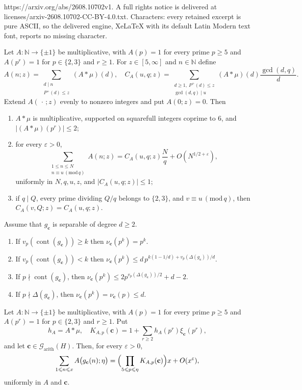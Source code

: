 \documentclass[10pt,a4paper]{amsart}
\DeclareMathOperator{\cont}{cont}
\newcommand{\NN}{\mathbb{N}}
\newcommand{\cc}{\mathbf{c}}
\renewcommand{\ge}{\geqslant}
\renewcommand{\le}{\leqslant}
\renewcommand{\pmod}[1]{\,(\mathrm{mod}\,#1)}
\begin{document}
https://arxiv.org/abs/2608.10702v1. A full rights notice is delivered at licenses/arxiv-2608.10702-CC-BY-4.0.txt. Characters: every retained excerpt is pure ASCII, so the delivered engine, XeLaTeX with its default Latin Modern text font, reports no missing character.
\begin{lemma}\label{lem:squarefull-kernel}
Let $A:\NN\to\{\pm1\}$ be multiplicative, with $A(p)=1$ for every prime $p\ge5$ and $A(p^r)=1$ for $p\in\{2,3\}$ and $r\ge1$.
For $z\in[5,\infty]$ and $n\in\NN$ define
\[
A(n;z)=\sum_{\substack{d\mid n\\P^+(d)\le z}}(A*\mu)(d),\quad
C_A(u,q;z)=\sum_{\substack{d\ge1,\ P^+(d)\le z\\\gcd(d,q)\mid u}}
(A*\mu)(d)\frac{\gcd(d,q)}d.
\]
Extend $A(\,\cdot\,;z)$ evenly to nonzero integers and put $A(0;z)=0$.
Then
\begin{enumerate}
\item $A*\mu$ is multiplicative, supported on squarefull integers coprime to $6$, and $|(A*\mu)(p^r)|\le2$;
\item for every $\varepsilon>0$,
\[
\sum_{\substack{1\le n\le N\\n\equiv u\pmod q}}A(n;z)
=C_A(u,q;z)\frac Nq+O(N^{1/2+\varepsilon}),
\]
uniformly in $N,q,u,z$, and $|C_A(u,q;z)|\le1$;
\item if $q\mid Q$, every prime dividing $Q/q$ belongs to $\{2,3\}$, and $v\equiv u\pmod q$, then $C_A(v,Q;z)=C_A(u,q;z)$.
\end{enumerate}
\end{lemma}

\begin{lemma}\label{lem:nu-bounds}
Assume that $g_\cc$ is separable of degree $d\ge 2$.
\begin{enumerate}
\item If $v_p(\cont(g_\cc))\ge k$ then $\nu_\cc(p^k)=p^k$.
\item If $v_p(\cont(g_\cc))<k$ then $\nu_\cc(p^k)\le d\,p^{k(1-1/d)+v_p(\Delta(g_\cc))/d}$.
\item If $p\nmid \cont(g_\cc)$, then $\nu_\cc(p^k)\le 2p^{v_p(\Delta(g_\cc))/2}+d-2$.
\item If $p\nmid \Delta(g_\cc)$, then $\nu_\cc(p^k)=\nu_\cc(p)\le d$.
\end{enumerate}
\end{lemma}

\begin{proposition}\label{prop:squarefull-polynomial-values}
Let $A:\NN\to\{\pm1\}$ be multiplicative, with $A(p)=1$ for every prime $p\ge5$ and $A(p^r)=1$ for $p\in\{2,3\}$ and $r\ge1$.
Put
\begin{equation}\label{eq:def-KAp}
h_A=A*\mu,\quad
K_{A,p}(\cc)=1+\sum_{r\ge2}h_A(p^r)\xi_\cc(p^r),
\end{equation}
and let $\cc\in\mathcal G_{\mathrm{arith}}(H)$.
Then, for every $\varepsilon>0$,
\[
\sum_{1\le n\le x}A\bigl(g_\cc(n);\eta\bigr)
=\Bigl(\prod_{5\le p\le\eta}K_{A,p}(\cc)\Bigr)x
+O(x^\varepsilon),
\]
uniformly in $A$ and $\cc$.
\end{proposition}
\end{document}
